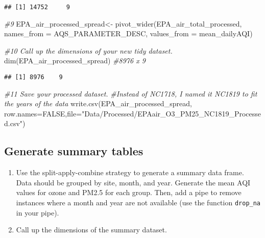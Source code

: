 \documentclass[
]{article}
\newenvironment{Shaded}{\begin{snugshade}}{\end{snugshade}}
\newcommand{\AttributeTok}[1]{\textcolor[rgb]{0.77,0.63,0.00}{#1}}
\newcommand{\CommentTok}[1]{\textcolor[rgb]{0.56,0.35,0.01}{\textit{#1}}}
\newcommand{\ConstantTok}[1]{\textcolor[rgb]{0.00,0.00,0.00}{#1}}
\newcommand{\FunctionTok}[1]{\textcolor[rgb]{0.00,0.00,0.00}{#1}}
\newcommand{\NormalTok}[1]{#1}
\newcommand{\OtherTok}[1]{\textcolor[rgb]{0.56,0.35,0.01}{#1}}
\newcommand{\StringTok}[1]{\textcolor[rgb]{0.31,0.60,0.02}{#1}}
\begin{document}
\begin{verbatim}
## [1] 14752     9
\end{verbatim}

\begin{Shaded}
\begin{Highlighting}[]
\CommentTok{\#9}
\NormalTok{EPA\_air\_processed\_spread}\OtherTok{\textless{}{-}} \FunctionTok{pivot\_wider}\NormalTok{(EPA\_air\_total\_processed, }
                  \AttributeTok{names\_from =}\NormalTok{ AQS\_PARAMETER\_DESC, }\AttributeTok{values\_from =}\NormalTok{ mean\_dailyAQI)}

\CommentTok{\#10 Call up the dimensions of your new tidy dataset.}
\FunctionTok{dim}\NormalTok{(EPA\_air\_processed\_spread) }\CommentTok{\#8976 x 9}
\end{Highlighting}
\end{Shaded}

\begin{verbatim}
## [1] 8976    9
\end{verbatim}

\begin{Shaded}
\begin{Highlighting}[]
\CommentTok{\#11 Save your processed dataset. }
\CommentTok{\#Instead of NC1718, I named it NC1819 to fit the years of the data}
\FunctionTok{write.csv}\NormalTok{(EPA\_air\_processed\_spread, }
          \AttributeTok{row.names=}\ConstantTok{FALSE}\NormalTok{,}\AttributeTok{file=}\StringTok{"Data/Processed/EPAair\_O3\_PM25\_NC1819\_Processed.csv"}\NormalTok{)}
\end{Highlighting}
\end{Shaded}

\hypertarget{generate-summary-tables}{%
\subsection{Generate summary tables}\label{generate-summary-tables}}

\begin{enumerate}
\def\labelenumi{\arabic{enumi}.}
\setcounter{enumi}{11}
\item
  Use the split-apply-combine strategy to generate a summary data frame.
  Data should be grouped by site, month, and year. Generate the mean AQI
  values for ozone and PM2.5 for each group. Then, add a pipe to remove
  instances where a month and year are not available (use the function
  \texttt{drop\_na} in your pipe).
\item
  Call up the dimensions of the summary dataset.
\end{enumerate}
\end{document}
